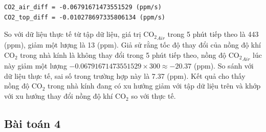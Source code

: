 \documentclass[a4paper]{article}
\begin{document}
\begin{verbatim}
CO2_air_diff = -0.06791671473551529 (ppm/s)
CO2_top_diff = -0.010278697335806134 (ppm/s)
\end{verbatim}

So với dữ liệu thực tế từ tập dữ liệu, giá trị $\mathrm{CO_{2}}_{Air}$ trong 5 phút tiếp theo là 443 (ppm), giảm một lượng là 13 (ppm). Giả sử rằng tốc độ thay đổi của nồng độ khí $\mathrm{CO_{2}}$ trong nhà kính là không thay đổi trong 5 phút tiếp theo, nồng độ $\mathrm{CO_{2}}_{Air}$ lúc này giảm một lượng $-0.06791671473551529 \times 300 \approx -20.37$ (ppm). So sánh với dữ liệu thực tế, sai số trong trường hợp này là 7.37 (ppm). Kết quả cho thấy nồng độ $\mathrm{CO_{2}}$ trong nhà kính đang có xu hướng giảm với tập dữ liệu trên và khớp với xu hướng thay đổi nồng độ khí $\mathrm{CO_{2}}$ so với thực tế.

\subsection{Bài toán 4}
\end{document}
